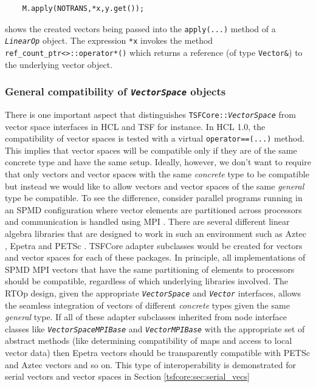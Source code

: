 \documentclass[10pt,fleqn]{article}
\begin{document}
{\scriptsize\begin{verbatim}
    M.apply(NOTRANS,*x,y.get());
\end{verbatim}}

shows the created vectors being passed into the \texttt{apply(...)}
method of a \texttt{\textit{LinearOp}} object.  The expression
\texttt{*x} invokes the method
\texttt{ref\_count\_ptr<>\-::operator*()} which returns a reference
(of type \texttt{Vector\&}) to the underlying vector object.

%
\subsubsection{General compatibility of \texttt{\textit{VectorSpace}} objects}
\label{tsfcore:sec:vec_spc_compatibility}
%

There is one important aspect that distinguishes
\texttt{TSFCore\-::\textit{VectorSpace}} from vector space interfaces in
HCL and TSF for instance.  In HCL 1.0, the compatibility of vector
spaces is tested with a virtual \texttt{operator==(...)}  method.
This implies that vector spaces will be compatible only if they are of
the same concrete type and have the same setup.  Ideally, however, we
don't want to require that only vectors and vector spaces with the
same {\em concrete} type to be compatible but instead we would like to
allow vectors and vector spaces of the same {\em general} type be
compatible.  To see the difference, consider parallel programs running
in an SPMD configuration where vector elements are partitioned across
processors and communication is handled using MPI
\cite{ref:mpi}.  There are several different linear algebra libraries
that are designed to work in such an environment such as Aztec
\cite{sd:aztec}, Epetra \cite{ref:Epetra} and PETSc \cite{ref:petsc}.  TSFCore
adapter subclasses would be created for vectors and vector spaces for
each of these packages.  In principle, all implementations of SPMD MPI
vectors that have the same partitioning of elements to processors
should be compatible, regardless of which underlying libraries
involved.  The RTOp design, given the appropriate
\texttt{\textit{VectorSpace}} and \texttt{\textit{Vector}} interfaces,
allows the seamless integration of vectors of different {\em concrete}
types given the same {\em general} type.  If all of these adapter
subclasses inherited from node interface classes like
\texttt{\textit{VectorSpaceMPIBase}} and
\texttt{\textit{VectorMPIBase}} with the appropriate set of abstract
methods (like determining compatibility of maps and access to local
vector data) then Epetra vectors should be transparently compatible
with PETSc and Aztec vectors and so on.  This type of interoperability
is demonstrated for serial vectors and vector spaces in Section
\ref{tsfcore:sec:serial_vecs}
\end{document}
